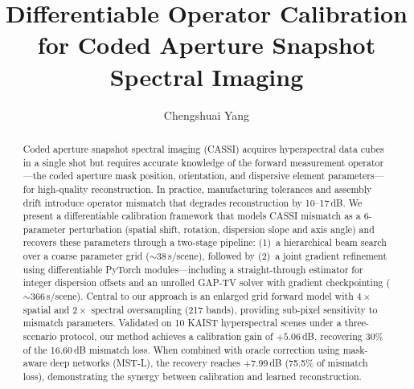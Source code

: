 \documentclass[runningheads]{llncs}
\begin{document}
\title{Differentiable Operator Calibration for Coded Aperture Snapshot Spectral Imaging}

\author{Chengshuai Yang}

\maketitle

\begin{abstract}
Coded aperture snapshot spectral imaging (CASSI) acquires hyperspectral data cubes in a single shot but requires accurate knowledge of the forward measurement operator---the coded aperture mask position, orientation, and dispersive element parameters---for high-quality reconstruction.
In practice, manufacturing tolerances and assembly drift introduce operator mismatch that degrades reconstruction by 10--17\,dB.
We present a differentiable calibration framework that models CASSI mismatch as a 6-parameter perturbation (spatial shift, rotation, dispersion slope and axis angle) and recovers these parameters through a two-stage pipeline:
(1)~a hierarchical beam search over a coarse parameter grid ($\sim$38\,s/scene), followed by
(2)~a joint gradient refinement using differentiable PyTorch modules---including a straight-through estimator for integer dispersion offsets and an unrolled GAP-TV solver with gradient checkpointing ($\sim$366\,s/scene).
Central to our approach is an enlarged grid forward model with $4\times$ spatial and $2\times$ spectral oversampling (217 bands), providing sub-pixel sensitivity to mismatch parameters.
Validated on 10 KAIST hyperspectral scenes under a three-scenario protocol, our method achieves a calibration gain of $+5.06$\,dB, recovering 30\% of the 16.60\,dB mismatch loss.
When combined with oracle correction using mask-aware deep networks (MST-L), the recovery reaches $+7.99$\,dB (75.5\% of mismatch loss), demonstrating the synergy between calibration and learned reconstruction.

\end{abstract}

\end{document}

